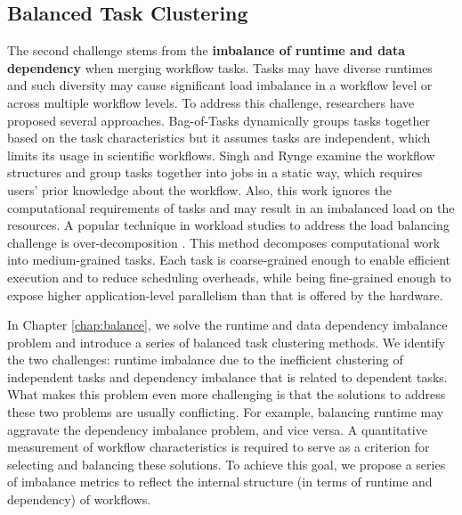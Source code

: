 \subsection{Balanced Task Clustering}

The second challenge stems from the \textbf{imbalance of runtime and data dependency} when merging workflow tasks. Tasks may have diverse runtimes and such diversity may cause significant load imbalance in a workflow level or across multiple workflow levels. To address this challenge, researchers have proposed several approaches. Bag-of-Tasks \cite{Hussin2010, Celaya2010, Oprescu2010} dynamically groups tasks together based on the task characteristics but it assumes tasks are independent, which limits its usage in scientific workflows. Singh \cite{Singh2008} and Rynge \cite{Rynge2012} examine the workflow structures and group tasks together into jobs in a static way, which requires users' prior knowledge about the workflow.
Also, this work ignores the computational requirements of tasks and may result in an imbalanced load on the resources. A popular technique in workload studies to address the load balancing challenge is over-decomposition \cite{Lifflander2012}. This method decomposes computational work into medium-grained tasks. Each task is coarse-grained enough to enable efficient execution and to reduce scheduling overheads, while being fine-grained enough to expose higher application-level parallelism than that is offered by the hardware. 

In Chapter \ref{chap:balance}, we solve the runtime and data dependency imbalance problem and introduce a series of {balanced task clustering} methods. 
We identify the two challenges: runtime imbalance due to the inefficient clustering of independent tasks and dependency imbalance that is related to dependent tasks. What makes this problem even more challenging is that the solutions to address these two problems are usually conflicting. For example, balancing runtime may aggravate the dependency imbalance problem, and vice versa. A quantitative measurement of workflow characteristics is required to serve as a criterion for selecting and balancing these solutions. To achieve this goal, we propose a series of imbalance metrics to reflect the internal structure (in terms of runtime and dependency) of workflows. 


